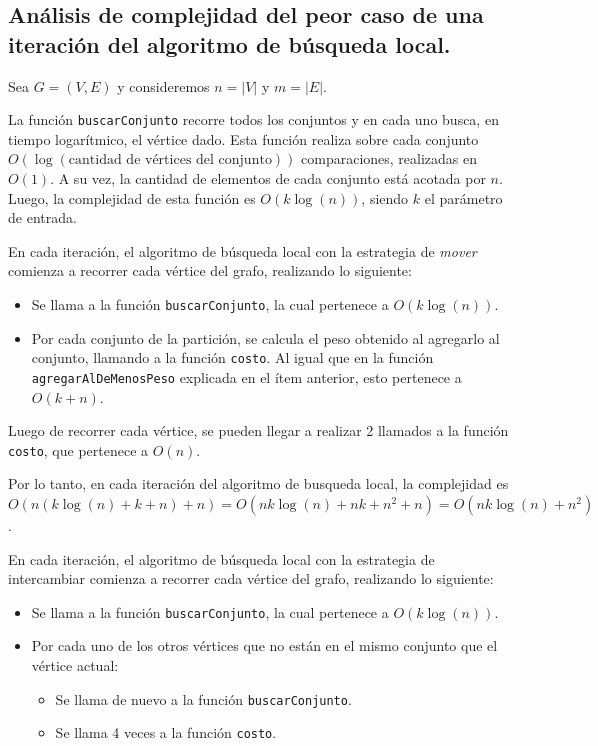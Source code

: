 \newpage
\subsection{Análisis de complejidad del peor caso de una iteración del
            algoritmo de búsqueda local.}
\vspace*{0.3cm}

Sea $G = (V,E)$ y consideremos $n = |V|$ y $m = |E|$.

La función \texttt{buscarConjunto} recorre todos los conjuntos y en cada uno
busca, en tiempo logarítmico, el vértice dado. Esta función realiza sobre cada
conjunto $O(\log(\text{cantidad de vértices del conjunto}))$ comparaciones,
realizadas en $O(1)$. A su vez, la cantidad de elementos de cada conjunto está
acotada por $n$. Luego, la complejidad de esta función es $O(k\log(n))$, siendo
$k$ el parámetro de entrada.

\vspace*{0.3cm}

En cada iteración, el algoritmo de búsqueda local con la estrategia de
\textit{mover} comienza a recorrer cada vértice del grafo, realizando lo siguiente:
\begin{itemize}
  \item Se llama a la función \texttt{buscarConjunto}, la cual pertenece a
  $O(k\log(n))$.

  \item Por cada conjunto de la partición, se calcula el peso obtenido al
  agregarlo al conjunto, llamando a la función \texttt{costo}. Al igual que en
  la función \texttt{agregarAlDeMenosPeso} explicada en el ítem anterior, esto
  pertenece a $O(k + n)$.
\end{itemize}

Luego de recorrer cada vértice, se pueden llegar a realizar 2 llamados a
la función \texttt{costo}, que pertenece a $O(n)$.

Por lo tanto, en cada iteración del algoritmo de busqueda local, la complejidad
es $O(n (k\log(n) + k + n) + n) = O(nk\log(n) + nk + n^2 + n) = O(nk\log(n) +
n^2)$.

\vspace*{0.3cm}

En cada iteración, el algoritmo de búsqueda local con la estrategia de
intercambiar comienza a recorrer cada vértice del grafo, realizando lo siguiente:

\begin{itemize}
  \item Se llama a la función \texttt{buscarConjunto}, la cual pertenece a
  $O(k\log(n))$.

  \item Por cada uno de los otros vértices que no están en el mismo conjunto
  que el vértice actual:

  \begin{itemize}
    \item Se llama de nuevo a la función \texttt{buscarConjunto}.

    \item Se llama 4 veces a la función \texttt{costo}.
  \end{itemize}
\end{itemize}

